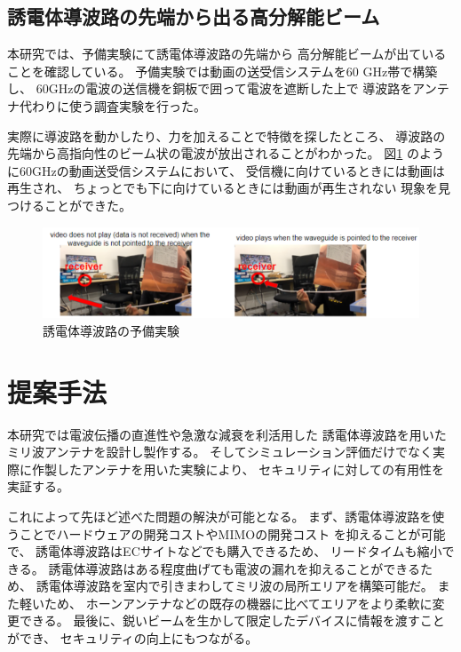 \documentclass[technicalreport]{ieicej}
\begin{document}
\subsection{誘電体導波路の先端から出る高分解能ビーム}

本研究では、予備実験にて誘電体導波路の先端から
高分解能ビームが出ていることを確認している。
予備実験では動画の送受信システムを60 GHz帯で構築し、
60GHzの電波の送信機を銅板で囲って電波を遮断した上で
導波路をアンテナ代わりに使う調査実験を行った。

実際に導波路を動かしたり、力を加えることで特徴を探したところ、
導波路の先端から高指向性のビーム状の電波が放出されることがわかった。
図\ref{fig:qualitative_experiment}
のように60GHzの動画送受信システムにおいて、
受信機に向けているときには動画は再生され、
ちょっとでも下に向けているときには動画が再生されない
現象を見つけることができた。

\begin{figure}[t]
  \begin{center}
    \includegraphics[bb=0 0 630.087950 152.271255, width=1.0\linewidth]{img/qualitative_experiment.pdf}
    \caption{誘電体導波路の予備実験}
    \label{fig:qualitative_experiment}
  \end{center}
\end{figure}


\section{提案手法}

本研究では電波伝播の直進性や急激な減衰を利活用した
誘電体導波路を用いたミリ波アンテナを設計し製作する。
そしてシミュレーション評価だけでなく実際に作製したアンテナを用いた実験により、
セキュリティに対しての有用性を実証する。

これによって先ほど述べた問題の解決が可能となる。
まず、誘電体導波路を使うことでハードウェアの開発コストやMIMOの開発コスト
を抑えることが可能で、
誘電体導波路はECサイトなどでも購入できるため、
リードタイムも縮小できる。
誘電体導波路はある程度曲げても電波の漏れを抑えることができるため、
誘電体導波路を室内で引きまわしてミリ波の局所エリアを構築可能だ。
また軽いため、
ホーンアンテナなどの既存の機器に比べてエリアをより柔軟に変更できる。
最後に、鋭いビームを生かして限定したデバイスに情報を渡すことができ、
セキュリティの向上にもつながる。
\end{document}
